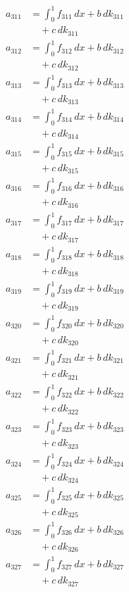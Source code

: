 \documentclass{article}
\begin{document}
\begin{align}
a_{311} &= \int_0^1 f_{311}\,dx + b\,dk_{311} \\
&\quad + c\,dk_{311} \\
a_{312} &= \int_0^1 f_{312}\,dx + b\,dk_{312} \\
&\quad + c\,dk_{312} \\
a_{313} &= \int_0^1 f_{313}\,dx + b\,dk_{313} \\
&\quad + c\,dk_{313} \\
a_{314} &= \int_0^1 f_{314}\,dx + b\,dk_{314} \\
&\quad + c\,dk_{314} \\
a_{315} &= \int_0^1 f_{315}\,dx + b\,dk_{315} \\
&\quad + c\,dk_{315} \\
a_{316} &= \int_0^1 f_{316}\,dx + b\,dk_{316} \\
&\quad + c\,dk_{316} \\
a_{317} &= \int_0^1 f_{317}\,dx + b\,dk_{317} \\
&\quad + c\,dk_{317} \\
a_{318} &= \int_0^1 f_{318}\,dx + b\,dk_{318} \\
&\quad + c\,dk_{318} \\
a_{319} &= \int_0^1 f_{319}\,dx + b\,dk_{319} \\
&\quad + c\,dk_{319} \\
a_{320} &= \int_0^1 f_{320}\,dx + b\,dk_{320} \\
&\quad + c\,dk_{320} \\
a_{321} &= \int_0^1 f_{321}\,dx + b\,dk_{321} \\
&\quad + c\,dk_{321} \\
a_{322} &= \int_0^1 f_{322}\,dx + b\,dk_{322} \\
&\quad + c\,dk_{322} \\
a_{323} &= \int_0^1 f_{323}\,dx + b\,dk_{323} \\
&\quad + c\,dk_{323} \\
a_{324} &= \int_0^1 f_{324}\,dx + b\,dk_{324} \\
&\quad + c\,dk_{324} \\
a_{325} &= \int_0^1 f_{325}\,dx + b\,dk_{325} \\
&\quad + c\,dk_{325} \\
a_{326} &= \int_0^1 f_{326}\,dx + b\,dk_{326} \\
&\quad + c\,dk_{326} \\
a_{327} &= \int_0^1 f_{327}\,dx + b\,dk_{327} \\
&\quad + c\,dk_{327} \\

\end{align}
\end{document}
